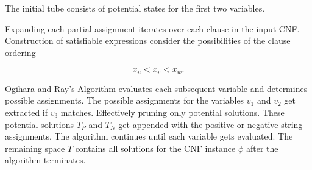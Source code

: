 
The initial tube consists of potential states for the first two variables.


Expanding each partial assignment iterates over each clause in the input CNF.  Construction of satisfiable expressions consider the possibilities of the clause ordering

\[
x_u < x_v < x_w.
\]

{\sc Ogihara and Ray's Algorithm} evaluates each subsequent variable and determines possible assignments.  The possible assignments for the variables $v_1$ and $v_2$ get extracted if $v_3$ matches.  Effectively pruning only potential solutions.  These potential solutions $T_P$ and $T_N$ get appended with the positive or negative string assignments.  The algorithm continues until each variable gets evaluated.  The remaining space $T$ contains all solutions for the CNF instance $\phi$ after the algorithm terminates.





%
%
%
%
%
%
%
%
%
		
